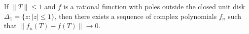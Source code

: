 If $\|T\| \leq 1$ and $f$ is a rational function with poles outside the closed unit disk $\Delta_1 = \{z : |z| \leq 1\}$, then there exists a sequence of complex polynomials $f_n$ such that $\|f_n(T) - f(T)\| \to 0$.
